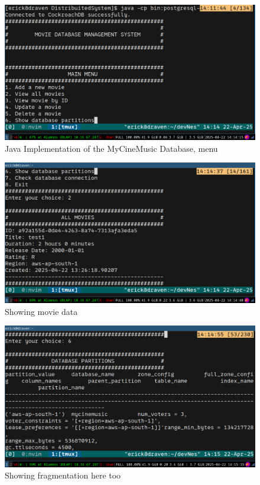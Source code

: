 \documentclass[twoside]{article}
\begin{document}
\begin{figure}[H]
  \centering
  \includegraphics[width=1\textwidth]{imgs/jav1.png}
  \caption{Java Implementation of the MyCineMusic Database, menu}
  \label{fig:4}
\end{figure}


\begin{figure}[H]
  \centering
  \includegraphics[width=1\textwidth]{imgs/jav2.png}
  \caption{Showing movie data}
  \label{fig:5}
\end{figure}

\begin{figure}[H]
  \centering
  \includegraphics[width=1\textwidth]{imgs/jav3.png}
  \caption{Showing fragmentation here too}
  \label{fig:6}
\end{figure}
\end{document}
